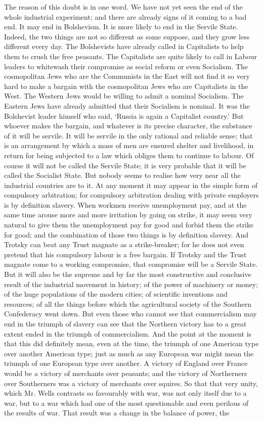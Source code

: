 \documentclass{book}
\begin{document}
The reason of this doubt is in one word. We have not yet seen the end of the whole industrial experiment; and there are already signs of it coming to a bad end. It may end in Bolshevism. It is more likely to end in the Servile State. Indeed, the two things are not so different as some suppose, and they grow less different every day. The Bolshevists have already called in Capitalists to help them to crush the free peasants. The Capitalists are quite likely to call in Labour leaders to whitewash their compromise as social reform or even Socialism. The cosmopolitan Jews who are the Communists in the East will not find it so very hard to make a bargain with the cosmopolitan Jews who are Capitalists in the West. The Western Jews would be willing to admit a nominal Socialism. The Eastern Jews have already admitted that their Socialism is nominal. It was the Bolshevist leader himself who said, ‘Russia is again a Capitalist country.’ But whoever makes the bargain, and whatever is its precise character, the substance of it will be servile. It will be servile in the only rational and reliable sense; that is an arrangement by which a mass of men are ensured shelter and livelihood, in return for being subjected to a law which obliges them to continue to labour. Of course it will not be called the Servile State; it is very probable that it will be called the Socialist State. But nobody seems to realise how very near all the industrial countries are to it. At any moment it may appear in the simple form of compulsory arbitration; for compulsory arbitration dealing with private employers is by definition slavery. When workmen receive unemployment pay, and at the same time arouse more and more irritation by going on strike, it may seem very natural to give them the unemployment pay for good and forbid them the strike for good; and the combination of those two things is by definition slavery. And Trotsky can beat any Trust magnate as a strike-breaker; for he does not even pretend that his compulsory labour is a free bargain. If Trotsky and the Trust magnate come to a working compromise, that compromise will be a Servile State. But it will also be the supreme and by far the most constructive and conclusive result of the industrial movement in history; of the power of machinery or money; of the huge populations of the modern cities; of scientific inventions and resources; of all the things before which the agricultural society of the Southern Confederacy went down. But even those who cannot see that commercialism may end in the triumph of slavery can see that the Northern victory has to a great extent ended in the triumph of commercialism. And the point at the moment is that this did definitely mean, even at the time, the triumph of one American type over another American type; just as much as any European war might mean the triumph of one European type over another. A victory of England over France would be a victory of merchants over peasants; and the victory of Northerners over Southerners was a victory of merchants over squires. So that that very unity, which Mr. Wells contrasts so favourably with war, was not only itself due to a war, but to a war which had one of the most questionable and even perilous of the results of war. That result was a change in the balance of power, the 
\end{document}

